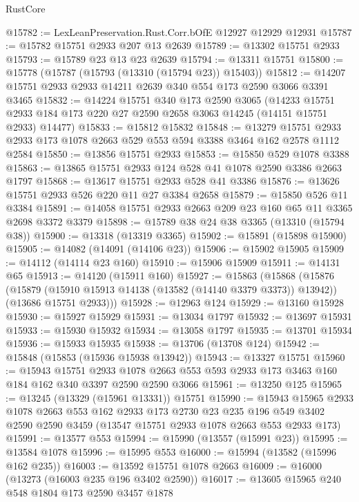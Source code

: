 \begin{lexlean}{RustCore}
\begin{coremodule}
@15782 := LexLeanPreservation.Rust.Corr.bOfE @12927 @12929 @12931
@15787 := @15782 @15751 @2933 @207 @13 @2639
@15789 := @13302 @15751 @2933
@15793 := @15789 @23 @13 @23 @2639
@15794 := @13311 @15751
@15800 := @15778 (@15787 (@15793 (@13310 (@15794 @23)) @15403))
@15812 := @14207 @15751 @2933 @2933 @14211 @2639 @340 @554 @173 @2590 @3066 @3391 @3465
@15832 := @14224
    @15751
    @340
    @173
    @2590
    @3065
    (@14233 @15751 @2933 @184 @173 @220 @27 @2590 @2658 @3063 @14245 (@14151 @15751 @2933) @14477)
@15833 := @15812 @15832
@15848 := @13279
    @15751
    @2933
    @2933
    @173
    @1078
    @2663
    @529
    @553
    @594
    @3388
    @3464
    @162
    @2578
    @1112
    @2584
@15850 := @13856 @15751 @2933
@15853 := @15850 @529 @1078 @3388
@15863 := @13865 @15751 @2933 @124 @528 @41 @1078 @2590 @3386 @2663 @1797
@15868 := @13617 @15751 @2933 @528 @41 @3386
@15876 := @13626 @15751 @2933 @526 @220 @11 @27 @3384 @2658
@15879 := @15850 @526 @11 @3384
@15891 := @14058 @15751 @2933 @2663 @209 @23 @160 @65 @11 @3365 @2698 @3372 @3379
@15898 := @15789 @38 @24 @38 @3365 (@13310 (@15794 @38))
@15900 := @13318 (@13319 @3365)
@15902 := @15891 (@15898 @15900)
@15905 := @14082 (@14091 (@14106 @23))
@15906 := @15902 @15905
@15909 := @14112 (@14114 @23 @160)
@15910 := @15906 @15909
@15911 := @14131 @65
@15913 := @14120 (@15911 @160)
@15927 := @15863
    (@15868
      (@15876
        (@15879 (@15910 @15913 @14138 (@13582 (@14140 @3379 @3373)) @13942))
        (@13686 @15751 @2933)))
@15928 := @12963 @124
@15929 := @13160 @15928
@15930 := @15927 @15929
@15931 := @13034 @1797
@15932 := @13697 @15931
@15933 := @15930 @15932
@15934 := @13058 @1797
@15935 := @13701 @15934
@15936 := @15933 @15935
@15938 := @13706 (@13708 @124)
@15942 := @15848 (@15853 (@15936 @15938 @13942))
@15943 := @13327 @15751
@15960 := @15943
    @15751
    @2933
    @1078
    @2663
    @553
    @593
    @2933
    @173
    @3463
    @160
    @184
    @162
    @340
    @3397
    @2590
    @2590
    @3066
@15961 := @13250 @125
@15965 := @13245 (@13329 (@15961 @13331)) @15751
@15990 := @15943
    @15965
    @2933
    @1078
    @2663
    @553
    @162
    @2933
    @173
    @2730
    @23
    @235
    @196
    @549
    @3402
    @2590
    @2590
    @3459
    (@13547 @15751 @2933 @1078 @2663 @553 @2933 @173)
@15991 := @13577 @553
@15994 := @15990 (@13557 (@15991 @23))
@15995 := @13584 @1078
@15996 := @15995 @553
@16000 := @15994 (@13582 (@15996 @162 @235))
@16003 := @13592 @15751 @1078 @2663
@16009 := @16000 (@13273 (@16003 @235 @196 @3402 @2590))
@16017 := @13605 @15965 @240 @548 @1804 @173 @2590 @3457 @1878

\end{coremodule}
\end{lexlean}
